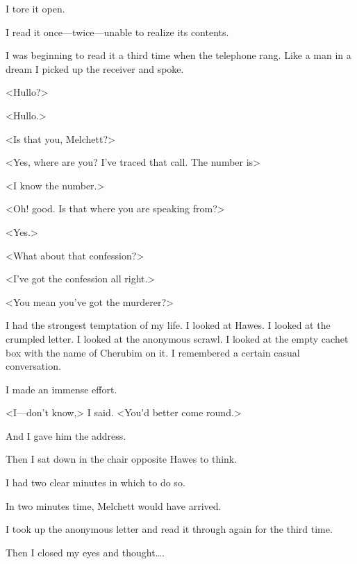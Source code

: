 I tore it open.

I read it once—twice—unable to realize its contents.

I was beginning to read it a third time when the telephone rang. Like a man in a dream I picked up the receiver and spoke.

<Hullo?>

<Hullo.>

<Is that you, Melchett?>

<Yes, where are you? I've traced that call. The number is\longdash>

<I know the number.>

<Oh! good. Is that where you are speaking from?>

<Yes.>

<What about that confession?>

<I've got the confession all right.>

<You mean you've got the murderer?>

I had the strongest temptation of my life. I looked at Hawes. I looked at the crumpled letter. I looked at the anonymous scrawl. I looked at the empty cachet box with the name of Cherubim on it. I remembered a certain casual conversation.

I made an immense effort.

<I—don't know,> I said. <You'd better come round.>

And I gave him the address.

Then I sat down in the chair opposite Hawes to think.

I had two clear minutes in which to do so.

In two minutes time, Melchett would have arrived.

I took up the anonymous letter and read it through again for the third time.

Then I closed my eyes and thought\dots.